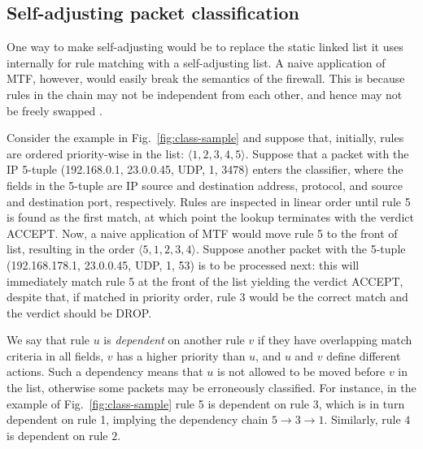 \subsection{Self-adjusting packet classification}
\label{sec:sa-sa-pack-class}

One way to make \nftables self-adjusting would be to replace the static linked list it uses internally for rule matching with a self-adjusting list. A naive application of MTF, however, would easily break the semantics of the firewall. This is because rules in the chain may not be independent from each other, and hence may not be freely swapped \cite{10.1145/2619239.2626294}.

Consider the example in Fig.~\ref{fig:class-sample} and suppose that, initially, rules are ordered priority-wise in the list: $\langle1, 2, 3, 4, 5\rangle$. Suppose that a packet with the IP 5-tuple (192.168.0.1, 23.0.0.45, UDP, 1, 3478) enters the classifier, where the fields in the 5-tuple are IP source and destination address, protocol, and source and destination port, respectively. Rules are inspected in linear order until rule 5 is found as the first match, at which point the lookup terminates with the verdict ACCEPT. Now, a naive application of MTF would move rule 5 to the front of list, resulting in the order $\langle5, 1, 2, 3, 4\rangle$. Suppose another packet with the 5-tuple (192.168.178.1, 23.0.0.45, UDP, 1, 53) is to be processed next: this will immediately match rule 5 at the front of the list yielding the verdict ACCEPT, despite that, if matched in priority order, rule 3 would be the correct match and the verdict should be DROP. %

We say that rule $u$ is \emph{dependent} on another rule $v$ if they have overlapping match criteria in all fields, $v$ has a higher priority than $u$, and $u$ and $v$ define different actions. Such a dependency means that $u$ is not allowed to be moved before $v$ in the list, otherwise some packets may be erroneously classified. For instance, in the example of Fig.~\ref{fig:class-sample} rule 5 is dependent on rule 3, which is in turn dependent on rule 1, implying the dependency chain $5\to 3\to 1$. Similarly, rule $4$ is dependent on rule $2$. %

